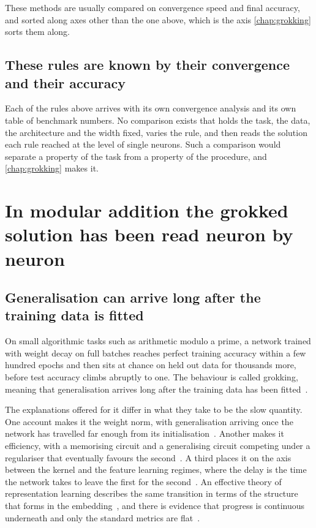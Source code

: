 These methods are usually compared on convergence speed and final accuracy,
and sorted along axes other than the one above, which is the axis
\cref{chap:grokking} sorts them along.

\subsection{These rules are known by their convergence and their accuracy}
\label{sec:bg_rulesgap}

Each of the rules above arrives with its own convergence analysis and its own
table of benchmark numbers. No comparison exists that holds the task, the
data, the architecture and the width fixed, varies the rule, and then reads
the solution each rule reached at the level of single neurons. Such a
comparison would separate a property of the task from a property of the
procedure, and \cref{chap:grokking} makes it.


\section{In modular addition the grokked solution has been read neuron by neuron}
\label{sec:bg_grokking}

\subsection{Generalisation can arrive long after the training data is fitted}
\label{sec:bg_grokphenomenon}

On small algorithmic tasks such as arithmetic modulo a prime, a network
trained with weight decay on full batches reaches perfect training accuracy
within a few hundred epochs and then sits at chance on held out data for
thousands more, before test accuracy climbs abruptly to one. The behaviour is
called grokking, meaning that generalisation arrives long after the training
data has been fitted~\cite{power_grokking_2022}.

The explanations offered for it differ in what they take to be the slow
quantity. One account makes it the weight norm, with generalisation arriving
once the network has travelled far enough from its
initialisation~\cite{liu_omnigrok_2022}. Another makes it efficiency, with a
memorising circuit and a generalising circuit competing under a regulariser
that eventually favours the second~\cite{varma_explaining_2023}. A third
places it on the axis between the kernel and the feature learning regimes,
where the delay is the time the network takes to leave the first for the
second~\cite{kumar_grokking_2024}. An effective theory of representation
learning describes the same transition in terms of the structure that forms in
the embedding~\cite{liu_understanding_2022}, and there is evidence that progress is
continuous underneath and only the standard metrics are
flat~\cite{barak_hidden_2022}.

